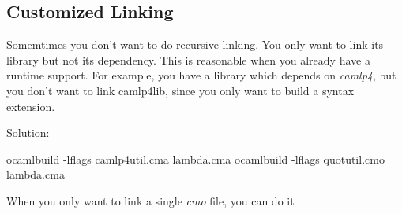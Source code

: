 \subsection{Customized Linking}
\label{Customized Linking}

Somemtimes you don't want to do recursive linking. You only want to
link its library but not its dependency. This is reasonable when you
already have a runtime support. For example, you have a library which
depends on \textit{camlp4}, but you don't want to link camlp4lib,
since you only want to build a syntax extension.

Solution:

\begin{bashcode}
   ocamlbuild  -lflags camlp4util.cma lambda.cma
   ocamlbuild  -lflags quotutil.cmo lambda.cma
\end{bashcode}

When you only want to link a single \textit{cmo} file, you can do it
